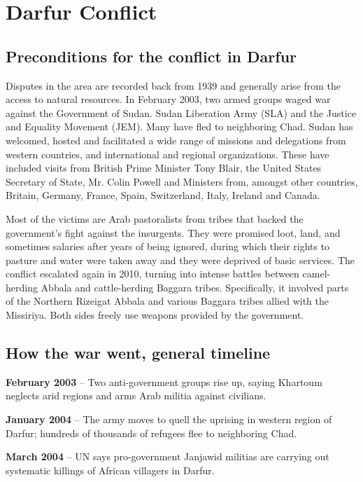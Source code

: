 \documentclass[14pt,a4paper]{article}
\begin{document}
\section{Darfur Conflict} %
\subsection{Preconditions for the conflict in Darfur}
Disputes in the area are recorded back from 1939 and generally arise from the access to natural resources. In February 2003, two armed groups waged war against the Government of Sudan. Sudan Liberation Army (SLA) and the Justice and Equality Movement (JEM). Many have fled to neighboring Chad. Sudan has welcomed, hosted and facilitated a wide range of missions and delegations from western countries, and international and regional organizations. These have included visits from British Prime Minister Tony Blair, the United States Secretary of State, Mr. Colin Powell and Ministers from, amongst other countries, Britain, Germany, France, Spain, Switzerland, Italy, Ireland and Canada.

Most of the victims are Arab pastoralists from tribes that backed the government's fight against the insurgents. They were promised loot, land, and sometimes salaries after years of being ignored, during which their rights to pasture and water were taken away and they were deprived of basic services.
The conflict escalated again in 2010, turning into intense battles between camel-herding Abbala and cattle-herding Baggara tribes. Specifically, it involved parts of the Northern Rizeigat Abbala and various Baggara tribes allied with the Missiriya. Both sides freely use weapons provided by the government. %
\subsection{How the war went, general timeline}
\textbf{February 2003} – Two anti-government groups rise up, saying Khartoum neglects arid regions and arms Arab militia against civilians.

\textbf{January 2004} – The army moves to quell the uprising in western region of Darfur; hundreds of thousands of refugees flee to neighboring Chad.

\textbf{March 2004} – UN says pro-government Janjawid militias are carrying out systematic killings of African villagers in Darfur.
\end{document}
